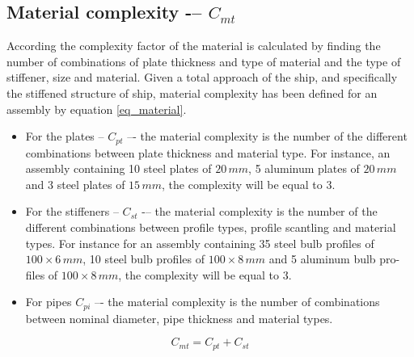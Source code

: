 \subsection{Material complexity -– $C_{mt}$}
According \cite{Rigterink2013} the complexity factor of the material is calculated by finding the number of combinations of plate thickness and type of material and the type of stiffener, size and material. 
Given a total approach of the ship, and specifically  the stiffened structure of ship, material complexity has been defined for an assembly by equation \ref{eq_material}.


\begin{itemize}
\item For the plates -- $C_{pt}$ –- the material complexity is the number of the different combinations between plate thickness and material type. For instance, an assembly containing 10 steel plates of $20 \, mm$, 5 aluminum plates of $20 \, mm$ and 3 steel plates of $15 \, mm$, the complexity will be equal to 3.
\item For the stiffeners -- $C_{st}$ -– the material complexity is the number of the different combinations between profile types, profile scantling and material types. For instance for an assembly containing 35 steel bulb profiles of $100 \times 6 \, mm$, 10 steel bulb profiles of $100 \times 8 \, mm$ and 5 aluminum bulb pro-files of $100 \times 8 \, mm$, the complexity will be equal to 3.
\item For pipes $C_{pi}$ –- the material complexity is the number of combinations between nominal diameter, pipe thickness and material types.
\end{itemize}


\begin{equation}
\label{eq_material}
C_{mt} = C_{pt}+C_{st}
\end{equation}


	

